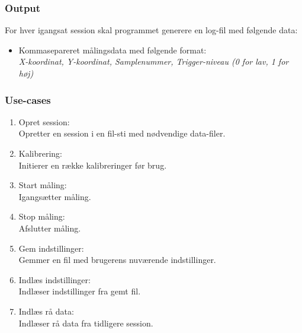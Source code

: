 \documentclass[rapport.tex]{subfiles}
\begin{document}
	
	
	\subsubsection{Output}
	For hver igangsat session skal programmet generere en log-fil med følgende data:
	\indent \begin{itemize}
		
		\item 	Kommasepareret målingsdata med følgende format: \\
		\textit{X-koordinat, Y-koordinat, Samplenummer, Trigger-niveau (0 for lav, 1 for høj)} 
	\end{itemize}
	
	\subsubsection{Use-cases}	
	\label{usec}
	\begin{enumerate}
		\item Opret session: \\Opretter en session i en fil-sti med nødvendige data-filer. 
		\item Kalibrering: \\Initierer en række kalibreringer før brug. 
		\item Start måling: \\Igangsætter måling.
		\item Stop måling: \\Afslutter måling.
		\item Gem indstillinger: \\Gemmer en fil med brugerens nuværende indstillinger.
		\item Indlæs indstillinger: \\Indlæser indstillinger fra gemt fil.
		\item Indlæs rå data: \\Indlæser rå data fra tidligere session. 
	\end{enumerate}
\end{document}
